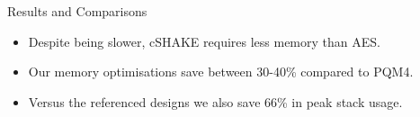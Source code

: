 \documentclass{beamer}            %
\begin{document}

\begin{frame}{Results and Comparisons}

\begin{itemize}
\item Despite being slower, cSHAKE requires less memory than AES.

\item Our memory optimisations save between 30-40\% compared to PQM4.

\item Versus the referenced designs we also save 66\% in peak stack usage.

\end{itemize}

\begin{table}[tbhp]
\centering
\caption{\footnotesize Stack usage in bytes for our microcontroller implementations.}
\end{table}

\end{frame}

\end{document}
